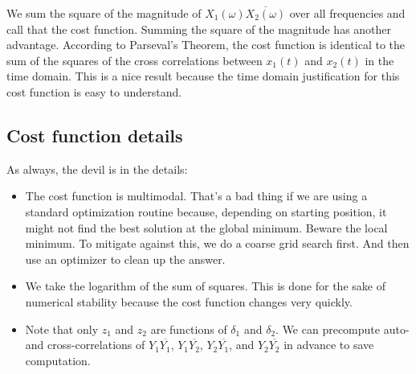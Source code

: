 We sum the square of the magnitude of $X_1(\omega)
\overline{X_2(\omega)}$ over all frequencies and call that the cost
function.  Summing the square of the magnitude has another
advantage. According to Parseval's Theorem, the cost function is
identical to the sum of the squares of the cross correlations between
$x_1(t)$ and $x_2(t)$ in the time domain. This is a nice result
because the time domain justification for this cost function is easy
to understand.


\subsection{Cost function details}

As always, the devil is in the details:

\begin{itemize}

\item The cost function is multimodal. That's a bad thing if we are
  using a standard optimization routine because, depending on starting
  position, it might not find the best solution at the global
  minimum. Beware the local minimum. To mitigate against this, we do a coarse
  grid search first. And then use an optimizer to clean up the answer.


\item We take the logarithm of the sum of squares. This is done for the sake of numerical stability because the cost function changes very quickly.

  \item Note that only $z_1$ and $z_2$ are functions of $\delta_1$ and $\delta_2$. We can precompute auto- and cross-correlations of  $Y_1 \overline{Y_1}$, $Y_1 \overline{Y_2}$, $Y_2 \overline{Y_1}$, and $Y_2 \overline{Y_2}$ in advance to save computation.


\end{itemize}



